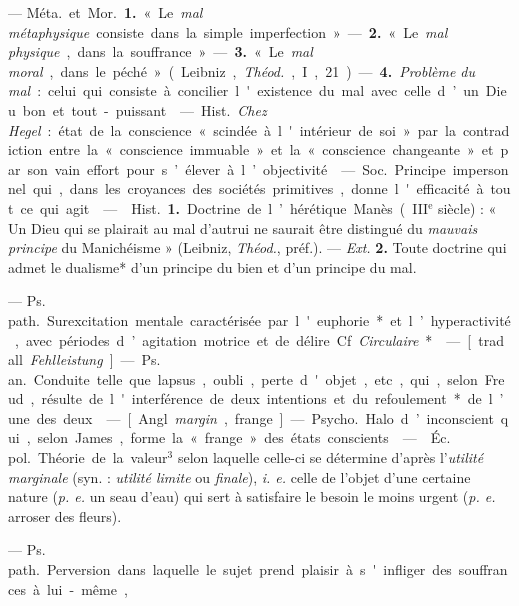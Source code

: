 \begin{itemize}[leftmargin=1cm, label=, itemsep=1pt]
 — \si{Méta.} et \si{Mor.} {\bf 1.} « Le {\it mal métaphysique}
consiste dans la simple imperfection ». — {\bf 2.} « Le {\it mal physique},
dans la souffrance ». — {\bf 3.} « Le {\it mal moral}, dans le
péché » (Leibniz, {\it Théod.}, I, 21). — {\bf 4.} {\it Problème du mal} :
celui qui consiste à concilier l'existence du mal avec celle d’un Dieu bon et
tout-puissant.

 — \si{Hist.} {\it Chez Hegel} : état de la
conscience « scindée à l'intérieur de soi » par la contradiction entre la
« conscience immuable » et la « conscience changeante » et par son vain
effort pour s’élever à l’objectivité.

 — \si{Soc.} Principe impersonnel qui, dans les croyances des
sociétés primitives, donne l'efficacité à tout ce qui agit.

 —  \si{Hist.} {\bf 1.} Doctrine de
l’hérétique Manès ({\footnotesize III}$^\text{e}$ siècle) : « Un Dieu qui se
plairait au mal d'autrui ne saurait être distingué du {\it mauvais principe}
du Manichéisme » (Leibniz, {\it Théod.}, préf.). — {\it Ext.} {\bf 2.} Toute
doctrine qui admet le dualisme* d’un principe du bien et d’un principe du mal.

 — \si{Ps. path.} Surexcitation mentale caractérisée par
l'euphorie* et l’hyperactivité, avec périodes
d’agitation motrice et de délire. Cf. {\it Circulaire}*.

 — [trad. all. {\it Fehlleistung}] — \si{Ps. an.} Conduite
telle que lapsus, oubli, perte d'objet, etc., qui, selon Freud, résulte de
l'interférence de deux intentions et du refoulement* de l’une des deux.

 — [Angl. {\it margin}, frange] — \si{Psycho.} Halo
d’inconscient qui, selon James, forme la « frange » des états conscients.

 —  \si{Éc. pol.} Théorie de la valeur$^3$
selon laquelle celle-ci se détermine d’après l'{\it utilité marginale}
(syn. : {\it utilité limite} ou {\it finale}), {\it i. e.} celle de l’objet
d'une certaine nature ({\it p. e.} un seau d’eau) qui sert à satisfaire le
besoin le moins urgent ({\it p. e.} arroser des fleurs).

 — \si{Ps. path.} Perversion dans laquelle le sujet prend
plaisir à s'infliger des souffrances à lui-même,


\end{itemize}
